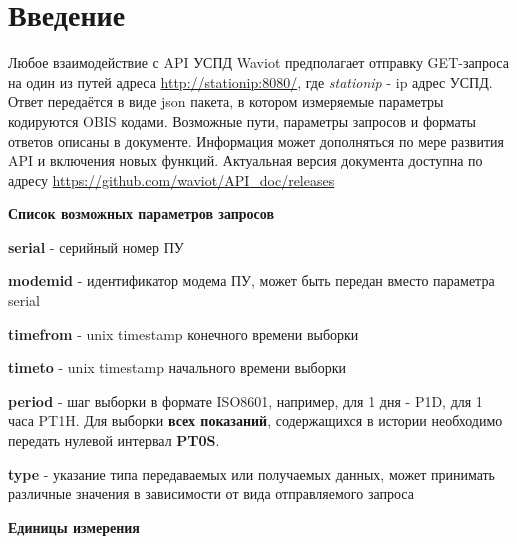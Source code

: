 \section*{Введение}

Любое взаимодействие с API УСПД Waviot предполагает отправку GET-запроса на один из путей адреса \url{http://stationip:8080/}, где \textit{stationip} - ip адрес УСПД. Ответ передаётся в виде json пакета, в котором измеряемые параметры кодируются OBIS кодами. Возможные пути, параметры запросов и форматы ответов описаны в документе. Информация может дополняться по мере развития API и включения новых функций. Актуальная версия документа доступна по адресу \url{https://github.com/waviot/API_doc/releases}

\bigskip

\bigskip

\bigskip

\textbf{\Large{Список возможных параметров запросов}}

\bigskip

\textbf{serial} - серийный номер ПУ

\bigskip

\textbf{modemid} - идентификатор модема ПУ, может быть передан вместо параметра serial

\bigskip

\textbf{timefrom} - unix timestamp конечного времени выборки

\bigskip

\textbf{timeto} - unix timestamp начального времени выборки

\bigskip

\textbf{period} - шаг выборки в формате ISO8601, например, для 1 дня - P1D, для 1 часа PT1H. Для выборки \textbf{всех показаний}, содержащихся в истории необходимо передать нулевой интервал \textbf{PT0S}.

\bigskip

\textbf{type} - указание типа передаваемых или получаемых данных, может принимать различные значения в зависимости от вида отправляемого запроса

\bigskip

\bigskip

\bigskip

\textbf{\Large{Единицы измерения}}

\bigskip

